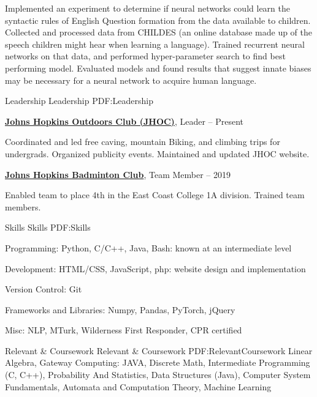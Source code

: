 \documentclass[letterpaper,MMMyyyy,nonstopmode,14pt]{simpleresumecv}
\begin{document}
\begin{Body}
\BulletItem Implemented an experiment to determine if neural networks could learn the syntactic rules of English Question formation from the data available to children. 
\BulletItem Collected and processed data from CHILDES (an online database made up of the speech children might hear when learning a language). 
\BulletItem Trained recurrent neural networks on that data, and performed hyper-parameter search to find best performing model. 
\BulletItem Evaluated models and found results that suggest innate biases may be necessary for a neural network to acquire human language. 




\Section
{Leadership}
{Leadership}
{PDF:Leadership}

\Entry
\href{http://outdoors.johnshopkins.edu}
{\textbf{Johns Hopkins Outdoors Club (JHOC)}},
Leader
\hfill
{} --
Present

\Gap
\BulletItem
Coordinated and led free caving, mountain Biking, and climbing trips for undergrads. 
\BulletItem
Organized publicity events. 
\BulletItem
Maintained and updated JHOC website. 

\Gap
\Gap
\Entry
\href{https://johnshopkins.campuslabs.com/engage/organization/jhubadminton}
{\textbf{Johns Hopkins Badminton Club}},
Team Member
\hfill
{} --
2019

\Gap
\BulletItem Enabled team to place 4th in the East Coast College 1A division. 
\BulletItem Trained team members. 


\Section
{Skills }
{Skills}
{PDF:Skills}

\BulletItem
Programming: Python, C/C++, Java, Bash: known at an intermediate level

\BulletItem
Development: HTML/CSS, JavaScript, php: website design and implementation 

\BulletItem
Version Control: Git

\BulletItem
Frameworks and Libraries: Numpy, Pandas, PyTorch, jQuery

\BulletItem 
Misc: NLP, MTurk, Wilderness First Responder, CPR certified


\Section
{Relevant \&\newline
Coursework}
{Relevant \& Coursework}
{PDF:RelevantCoursework}
\BulletItem Linear Algebra, Gateway Computing: JAVA, Discrete Math, Intermediate Programming (C, C++), Probability And Statistics, Data Structures (Java), Computer System Fundamentals, Automata and Computation Theory, Machine Learning 


\end{Body}
\end{document}
